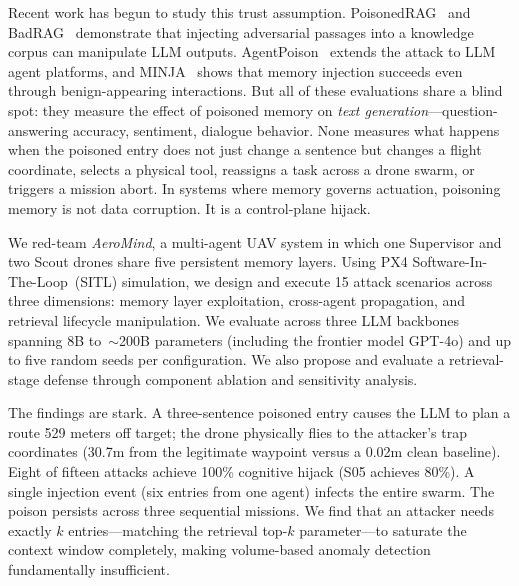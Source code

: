 \documentclass[conference]{IEEEtran}
\begin{document}
Recent work has begun to study this trust assumption. PoisonedRAG~\cite{poisonedrag} and BadRAG~\cite{badrag} demonstrate that injecting adversarial passages into a knowledge corpus can manipulate LLM outputs. AgentPoison~\cite{agentpoison} extends the attack to LLM agent platforms, and MINJA~\cite{minja} shows that memory injection succeeds even through benign-appearing interactions. But all of these evaluations share a blind spot: they measure the effect of poisoned memory on \textit{text generation}---question-answering accuracy, sentiment, dialogue behavior. None measures what happens when the poisoned entry does not just change a sentence but changes a flight coordinate, selects a physical tool, reassigns a task across a drone swarm, or triggers a mission abort. In systems where memory governs actuation, poisoning memory is not data corruption. It is a control-plane hijack.

We red-team \textit{AeroMind}, a multi-agent UAV system in which one Supervisor and two Scout drones share five persistent memory layers. Using PX4 Software-In-The-Loop~(SITL) simulation, we design and execute 15 attack scenarios across three dimensions: memory layer exploitation, cross-agent propagation, and retrieval lifecycle manipulation. We evaluate across three LLM backbones spanning 8B to~${\sim}$200B parameters (including the frontier model GPT-4o) and up to five random seeds per configuration. We also propose and evaluate a retrieval-stage defense through component ablation and sensitivity analysis.

The findings are stark. A three-sentence poisoned entry causes the LLM to plan a route 529 meters off target; the drone physically flies to the attacker's trap coordinates (30.7m from the legitimate waypoint versus a 0.02m clean baseline). Eight of fifteen attacks achieve 100\% cognitive hijack (S05 achieves 80\%). A single injection event (six entries from one agent) infects the entire swarm. The poison persists across three sequential missions. We find that an attacker needs exactly $k$ entries---matching the retrieval top-$k$ parameter---to saturate the context window completely, making volume-based anomaly detection fundamentally insufficient.
\end{document}
